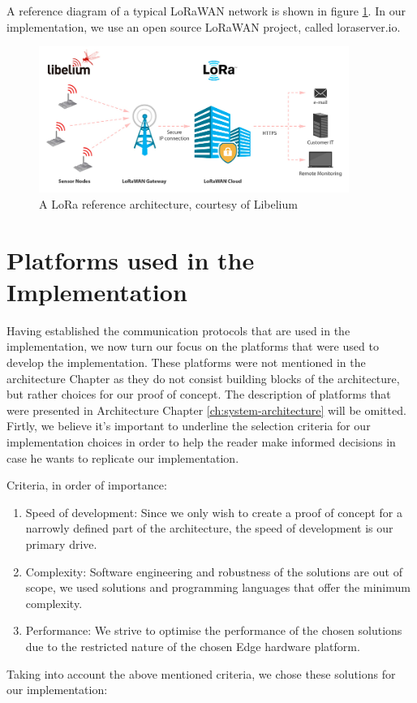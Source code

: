 A reference diagram of a typical LoRaWAN network is shown in figure \ref{fig:LoRa}. In our implementation, we use an open source LoRaWAN project, called loraserver.io.
\clearpage

\begin{figure}[H]
    \centering
    \includegraphics[width=0.9\textwidth]{images/lora_arch.jpg}
    \caption{A LoRa reference architecture, courtesy of Libelium\cite{libelium}}
    \label{fig:LoRa}
\end{figure}

\section{Platforms used in the Implementation}
Having established the communication protocols that are used in the implementation, we now turn our focus on the platforms that were used to develop the implementation. These platforms were not mentioned in the architecture Chapter as they do not consist building blocks of the architecture, but rather choices for our proof of concept. The description of platforms that were presented in Architecture Chapter \ref{ch:system-architecture} will be omitted. Firtly, we believe it’s important to underline the selection criteria for our implementation choices in order to help the reader make informed decisions in case he wants to replicate our implementation.

Criteria, in order of importance:
\begin{enumerate}
    \item Speed of development:  Since we only wish to create a proof of concept for a narrowly defined part of the architecture, the speed of development is our primary drive.
    \item Complexity: Software engineering and robustness of the solutions are out of scope, we used solutions and programming languages that offer the minimum complexity.
\item Performance: We strive to optimise the performance of the chosen solutions due to the restricted nature of the chosen Edge hardware platform.

\end{enumerate}
\noindent
Taking into account the above mentioned criteria, we chose these solutions for our implementation:

